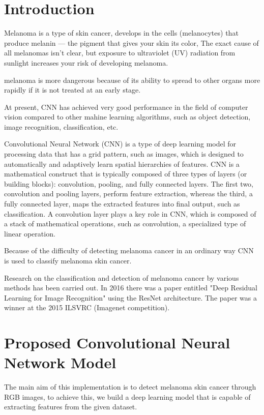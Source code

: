 \section{Introduction}
    Melanoma is a type of skin cancer, develops in the cells (melanocytes) that produce melanin — the pigment that gives your skin its color, The exact cause of all melanomas isn't clear, but exposure to ultraviolet (UV) radiation from sunlight increases your risk of developing melanoma. ~\cite{mayo2022}

    melanoma is more dangerous because of its ability to spread to other organs more rapidly if it is not treated at an early stage. ~\cite{scfm2022}

    At present, CNN has achieved very good performance in the field of computer vision compared to other mahine learning algorithms, such as object detection, image recognition, classification, etc. 

    Convolutional Neural Network (CNN) is a type of deep learning model for processing data that has a grid pattern, such as images, which is designed to automatically and adaptively learn spatial hierarchies of features. CNN is a mathematical construct that is typically composed of three types of layers (or building blocks): convolution, pooling, and fully connected layers. The first two, convolution and pooling layers, perform feature extraction, whereas the third, a fully connected layer, maps the extracted features into final output, such as classification. A convolution layer plays a key role in CNN, which is composed of a stack of mathematical operations, such as convolution, a specialized type of linear operation. \cite{Yamashita2018}

    Because of the difficulty of detecting melanoma cancer in an ordinary way CNN is used to classify melanoma skin cancer.

    Research on the classification and detection of melanoma cancer by various methods has been carried out. In 2016 there was a paper entitled "Deep Residual Learning for Image Recognition" using the ResNet architecture. The paper was a winner at the 2015 ILSVRC (Imagenet competition). ~\cite{Arief2019}


\section{Proposed Convolutional Neural Network Model}
    The main aim of this implementation is to detect melanoma skin cancer through RGB images, to achieve this, we build a deep learning model that is capable of extracting features from the given dataset.

